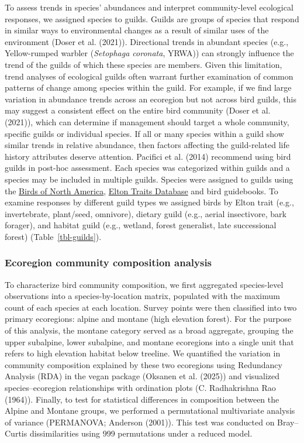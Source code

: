 \documentclass[
  letterpaper,
  DIV=11,
  numbers=noendperiod]{scrartcl}
\begin{document}
To assess trends in species' abundances and interpret community-level
ecological responses, we assigned species to guilds. Guilds are groups
of species that respond in similar ways to environmental changes as a
result of similar uses of the environment (Doser et al. (2021)).
Directional trends in abundant species (e.g., Yellow-rumped warbler
(\emph{Setophaga coronata}, YRWA)) can strongly influence the trend of
the guilds of which these species are members. Given this limitation,
trend analyses of ecological guilds often warrant further examination of
common patterns of change among species within the guild. For example,
if we find large variation in abundance trends across an ecoregion but
not across bird guilds, this may suggest a consistent effect on the
entire bird community (Doser et al. (2021)), which can determine if
management should target a whole community, specific guilds or
individual species. If all or many species within a guild show similar
trends in relative abundance, then factors affecting the guild-related
life history attributes deserve attention. Pacifici et al. (2014)
recommend using bird guilds in post-hoc assessment. Each species was
categorized within guilds and a species may be included in multiple
guilds. Species were assigned to guilds using the
\href{https://birdsna.org}{Birds of North America},
\href{https://esajournals.onlinelibrary.wiley.com/doi/10.1890/13-1917.1}{Elton
Traits Database} and bird guidebooks. To examine responses by different
guild types we assigned birds by Elton trait (e.g., invertebrate,
plant/seed, omnivore), dietary guild (e.g., aerial insectivore, bark
forager), and habitat guild (e.g., wetland, forest generalist, late
successional forest) (Table~\ref{tbl-guilds}).

\subsubsection{Ecoregion community composition
analysis}\label{ecoregion-community-composition-analysis}

To characterize bird community composition, we first aggregated
species-level observations into a species-by-location matrix, populated
with the maximum count of each species at each location. Survey points
were then classified into two primary ecoregions: alpine and montane
(high elevation forest). For the purpose of this analysis, the montane
category served as a broad aggregate, grouping the upper subalpine,
lower subalpine, and montane ecoregions into a single unit that refers
to high elevation habitat below treeline. We quantified the variation in
community composition explained by these two ecoregions using Redundancy
Analysis (RDA) in the vegan package (Oksanen et al. (2025)) and
visualized species--ecoregion relationships with ordination plots (C.
Radhakrishna Rao (1964)). Finally, to test for statistical differences
in composition between the Alpine and Montane groups, we performed a
permutational multivariate analysis of variance (PERMANOVA; Anderson
(2001)). This test was conducted on Bray--Curtis dissimilarities using
999 permutations under a reduced model.
\end{document}
